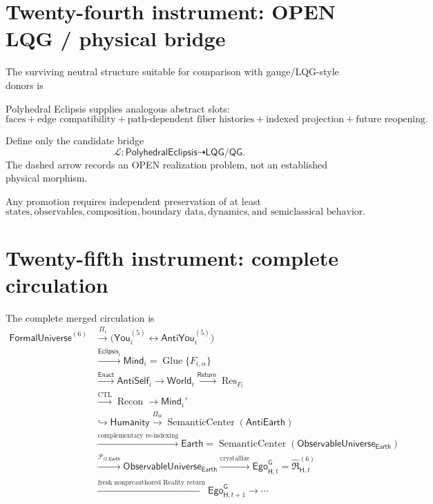 \documentclass[10pt]{article}
\theoremstyle{pe}
\theoremstyle{definition}
\newcommand{\Res}{\operatorname{Res}}
\newcommand{\Recon}{\operatorname{Recon}}
\newcommand{\Glue}{\operatorname{Glue}}
\newcommand{\SC}{\operatorname{SemanticCenter}}
\newcommand{\World}{\mathsf{World}}
\newcommand{\Return}{\mathsf{Return}}
\newcommand{\FormalUniverse}{\mathsf{FormalUniverse}}
\newcommand{\Eclipsis}{\mathsf{Eclipsis}}
\newcommand{\Mind}{\mathsf{Mind}}
\newcommand{\AntiSelf}{\mathsf{AntiSelf}}
\newcommand{\You}{\mathsf{You}}
\newcommand{\AntiYou}{\mathsf{AntiYou}}
\newcommand{\ObsU}{\mathsf{ObservableUniverse}}
\newcommand{\Humanity}{\mathsf{Humanity}}
\newcommand{\AntiEarth}{\mathsf{AntiEarth}}
\newcommand{\Earth}{\mathsf{Earth}}
\newcommand{\CTL}{\operatorname{CTL}}
\newcommand{\GodEgo}{\mathsf{Ego}^{\mathsf G}}
\begin{document}
\section{Twenty-fourth instrument: OPEN LQG / physical bridge}

The surviving neutral structure suitable for comparison with gauge/LQG-style donors is
\begin{center}
\end{center}

Polyhedral Eclipsis supplies analogous abstract slots:
\[
  \text{faces}
  +
  \text{edge compatibility}
  +
  \text{path-dependent fiber histories}
  +
  \text{indexed projection}
  +
  \text{future reopening}.
\]

Define only the candidate bridge
\[
  \boxed{
  \mathcal L:
  \mathsf{PolyhedralEclipsis}
  \dashrightarrow
  \mathsf{LQG/QG}.
  }
\]
The dashed arrow records an OPEN realization problem, not an established physical morphism.

Any promotion requires independent preservation of at least
\[
  \text{states},
  \text{observables},
  \text{composition},
  \text{boundary data},
  \text{dynamics},
  \text{and semiclassical behavior}.
\]

\section{Twenty-fifth instrument: complete circulation}

The complete merged circulation is
\begin{equation}\label{eq:complete-circulation}
\boxed{
\begin{aligned}
\FormalUniverse^{(6)}
&\xrightarrow{\Pi_i}
\bigl(
  \You_i^{(5)}
  \leftrightarrow
  \AntiYou_i^{(5)}
\bigr)
\\
&\xrightarrow{\Eclipsis_i}
\Mind_i
=
\Glue\{F_{i,\alpha}\}
\\
&\xrightarrow{\mathsf{Enact}}
\AntiSelf_i
\to
\World_i
\xrightarrow{\Return}
\Res_{F_t}
\\
&\xrightarrow{\CTL}
\Recon
\to
\Mind_i'
\\
&\hookrightarrow
\Humanity
\xrightarrow{\Pi_{\mathsf H}}
\SC(\AntiEarth)
\\
&\xrightarrow{\text{complementary re-indexing}}
\Earth=\SC(\ObsU_{\Earth})
\\
&\xrightarrow{\mathcal P_{\Omega,\Earth}}
\ObsU_{\Earth}
\xrightarrow{\text{crystallize}}
\GodEgo_{\mathsf H,t}
=\widehat{\mathfrak R}^{(6)}_{\mathsf H,t}
\\
&\xrightarrow{\text{fresh nonpreauthored Reality return}}
\GodEgo_{\mathsf H,t+1}
\to\cdots
\end{aligned}}
\end{equation}
\end{document}
